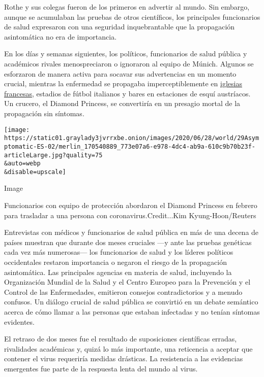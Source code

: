 Rothe y sus colegas fueron de los primeros en advertir al mundo. Sin
embargo, aunque se acumulaban las pruebas de otros científicos, los
principales funcionarios de salud expresaron con una seguridad
inquebrantable que la propagación asintomática no era de importancia.

En los días y semanas siguientes, los políticos, funcionarios de salud
pública y académicos rivales menospreciaron o ignoraron al equipo de
Múnich. Algunos se esforzaron de manera activa para socavar sus
advertencias en un momento crucial, mientras la enfermedad se propagaba
imperceptiblemente en
\href{https://www.reuters.com/article/us-health-coronavirus-france-church-spec/special-report-five-days-of-worship-that-set-a-virus-time-bomb-in-france-idUSKBN21H0Q2}{iglesias
francesas}, estadios de fútbol italianos y bares en estaciones de esquí
austríacos. Un crucero, el Diamond Princess, se convertiría en un
presagio mortal de la propagación sin síntomas.

\texttt{[image: https://static01.graylady3jvrrxbe.onion/images/2020/06/28/world/29Asymptomatic-ES-02/merlin\_170540889\_773e07a6-e978-4dc4-ab9a-610c9b70b23f-articleLarge.jpg?quality=75\\\&auto=webp\\\&disable=upscale]}

Image

Funcionarios con equipo de protección abordaron el Diamond Princess en
febrero para trasladar a una persona con coronavirus.Credit...Kim
Kyung-Hoon/Reuters

Entrevistas con médicos y funcionarios de salud pública en más de una
decena de países muestran que durante dos meses cruciales ---y ante las
pruebas genéticas cada vez más numerosas--- los funcionarios de salud y
los líderes políticos occidentales restaron importancia o negaron el
riesgo de la propagación asintomática. Las principales agencias en
materia de salud, incluyendo la Organización Mundial de la Salud y el
Centro Europeo para la Prevención y el Control de las Enfermedades,
emitieron consejos contradictorios y a menudo confusos. Un diálogo
crucial de salud pública se convirtió en un debate semántico acerca de
cómo llamar a las personas que estaban infectadas y no tenían síntomas
evidentes.

El retraso de dos meses fue el resultado de suposiciones científicas
erradas, rivalidades académicas y, quizá lo más importante, una
reticencia a aceptar que contener el virus requeriría medidas drásticas.
La resistencia a las evidencias emergentes fue parte de la respuesta
lenta del mundo al virus.

